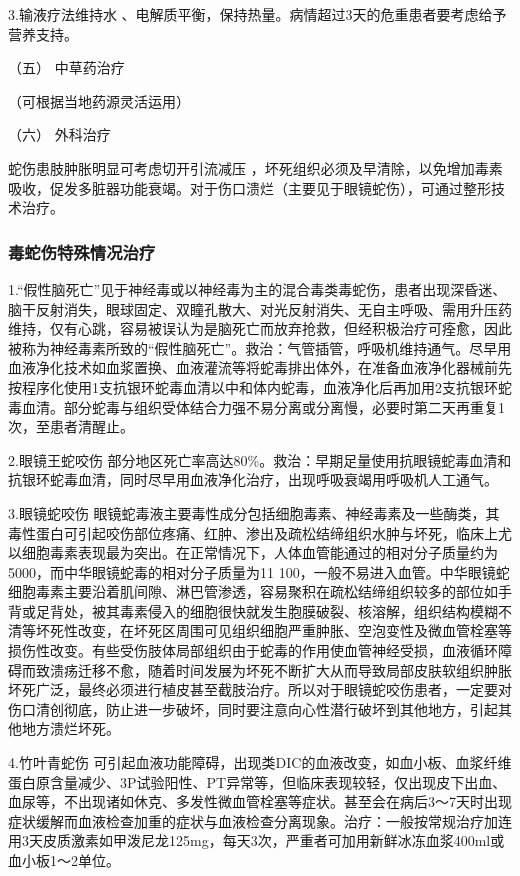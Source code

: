 3.输液疗法维持水
、电解质平衡，保持热量。病情超过3天的危重患者要考虑给予营养支持。

\hypertarget{text00172.htmlux5cux23CHP5-8-1-3-3-5}{}
（五） 中草药治疗

（可根据当地药源灵活运用）

\hypertarget{text00172.htmlux5cux23CHP5-8-1-3-3-6}{}
（六） 外科治疗

蛇伤患肢肿胀明显可考虑切开引流减压
，坏死组织必须及早清除，以免增加毒素吸收，促发多脏器功能衰竭。对于伤口溃烂（主要见于眼镜蛇伤），可通过整形技术治疗。

\subsubsection{毒蛇伤特殊情况治疗}

1.“假性脑死亡”见于神经毒或以神经毒为主的混合毒类毒蛇伤，患者出现深昏迷、脑干反射消失，眼球固定、双瞳孔散大、对光反射消失、无自主呼吸、需用升压药维持，仅有心跳，容易被误认为是脑死亡而放弃抢救，但经积极治疗可痊愈，因此被称为神经毒素所致的“假性脑死亡”。救治：气管插管，呼吸机维持通气。尽早用血液净化技术如血浆置换、血液灌流等将蛇毒排出体外，在准备血液净化器械前先按程序化使用1支抗银环蛇毒血清以中和体内蛇毒，血液净化后再加用2支抗银环蛇毒血清。部分蛇毒与组织受体结合力强不易分离或分离慢，必要时第二天再重复1次，至患者清醒止。

2.眼镜王蛇咬伤
部分地区死亡率高达80\%。救治：早期足量使用抗眼镜蛇毒血清和抗银环蛇毒血清，同时尽早用血液净化治疗，出现呼吸衰竭用呼吸机人工通气。

3.眼镜蛇咬伤
眼镜蛇毒液主要毒性成分包括细胞毒素、神经毒素及一些酶类，其毒性蛋白可引起咬伤部位疼痛、红肿、渗出及疏松结缔组织水肿与坏死，临床上尤以细胞毒素表现最为突出。在正常情况下，人体血管能通过的相对分子质量约为5000，而中华眼镜蛇毒的相对分子质量为11
100，一般不易进入血管。中华眼镜蛇细胞毒素主要沿着肌间隙、淋巴管渗透，容易聚积在疏松结缔组织较多的部位如手背或足背处，被其毒素侵入的细胞很快就发生胞膜破裂、核溶解，组织结构模糊不清等坏死性改变，在坏死区周围可见组织细胞严重肿胀、空泡变性及微血管栓塞等损伤性改变。有些受伤肢体局部组织由于蛇毒的作用使血管神经受损，血液循环障碍而致溃疡迁移不愈，随着时间发展为坏死不断扩大从而导致局部皮肤软组织肿胀坏死广泛，最终必须进行植皮甚至截肢治疗。所以对于眼镜蛇咬伤患者，一定要对伤口清创彻底，防止进一步破坏，同时要注意向心性潜行破坏到其他地方，引起其他地方溃烂坏死。

4.竹叶青蛇伤
可引起血液功能障碍，出现类DIC的血液改变，如血小板、血浆纤维蛋白原含量减少、3P试验阳性、PT异常等，但临床表现较轻，仅出现皮下出血、血尿等，不出现诸如休克、多发性微血管栓塞等症状。甚至会在病后3～7天时出现症状缓解而血液检查加重的症状与血液检查分离现象。治疗：一般按常规治疗加连用3天皮质激素如甲泼尼龙125mg，每天3次，严重者可加用新鲜冰冻血浆400ml或血小板1～2单位。

